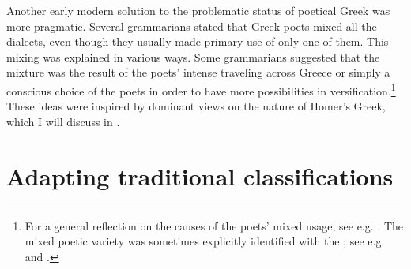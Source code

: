Another early modern solution to the problematic status of poetical Greek was more pragmatic. Several grammarians stated that Greek poets mixed all the dialects, even though they usually made primary use of only one of them. This mixing was explained in various ways. Some grammarians suggested that the mixture was the result of the poets’ intense traveling across Greece or simply a conscious choice of the poets in order to have more possibilities in versification.\footnote{For a general reflection on the causes of the poets’ mixed usage, see e.g. \citet[*.3\textsc{\textsuperscript{r}}–*.4\textsc{\textsuperscript{r}}]{Gottleber1765}. The mixed poetic variety was sometimes explicitly identified with the ; see e.g. \citet[111]{Bayly1756} and \citet[198]{Peternader1776}.} These ideas were inspired by dominant views on the nature of Homer’s Greek, which I will discuss in . 

\section{Adapting traditional classifications}\label{sec:2.8}

